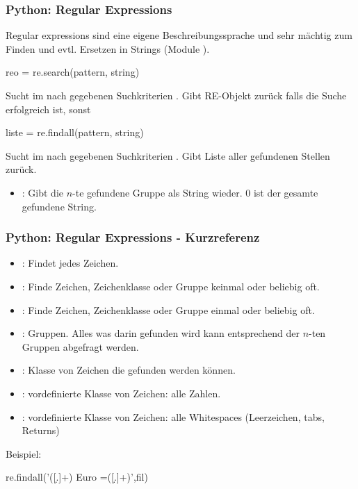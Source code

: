 \documentclass[hyperref={xetex}]{beamer}
\begin{document}
%
%
\begin{frame}[fragile]\frametitle{Python: Regular Expressions}
Regular expressions sind eine eigene Beschreibungssprache und sehr mächtig
zum Finden und evtl. Ersetzen in Strings (Module ).

\begin{pyin}
reo = re.search(pattern, string)
\end{pyin}
Sucht im  nach gegebenen Suchkriterien . Gibt RE-Objekt zurück falls die Suche erfolgreich ist, sonst 
\begin{pyin}
liste = re.findall(pattern, string)
\end{pyin}
Sucht im  nach gegebenen Suchkriterien . Gibt Liste aller gefundenen Stellen zurück.
\begin{itemize}
  \item {}: Gibt die $n$-te gefundene Gruppe als String wieder. $0$ ist der gesamte gefundene String.
\end{itemize}
\end{frame}
%
%
\begin{frame}[fragile]\frametitle{Python: Regular Expressions - Kurzreferenz}

  \begin{itemize}
    \item {}: Findet jedes Zeichen.
    \item \isage{*}: Finde Zeichen, Zeichenklasse oder Gruppe keinmal oder beliebig oft.
    \item \isage{+}: Finde Zeichen, Zeichenklasse oder Gruppe einmal oder beliebig oft.
    \item {}: Gruppen. Alles was darin gefunden wird kann entsprechend der $n$-ten Gruppen abgefragt werden.
    \item \isage{[..]}: Klasse von Zeichen die gefunden werden können.
    \item \isage{\\d}: vordefinierte Klasse von Zeichen: alle Zahlen.
    \item \isage{\\s}: vordefinierte Klasse von Zeichen: alle Whitespaces (Leerzeichen, tabs, Returns)
  \end{itemize}
  Beispiel:
  \begin{pyin}
re.findall('([\d.]+) Euro =\s*([\d.]+)',fil)
  \end{pyin}
\end{frame}
%
\end{document}
